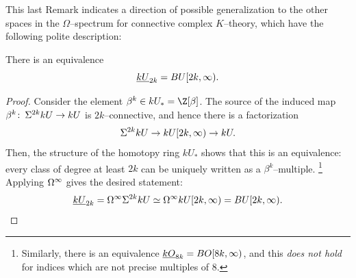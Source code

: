 This last Remark indicates a direction of possible generalization to the other spaces in the \(\Omega\)--spectrum for connective complex \(K\)--theory, which have the following polite description:
\begin{lemma}
There is an equivalence \[\OS{kU}{2k} = BU[2k, \infty).\]
\end{lemma}
\begin{proof}
Consider the element \(\beta^k \in kU_* = \Z[\beta]\).
The source of the induced map \(\beta^k\colon\thinspace \Sigma^{2k} kU \to kU\) is \(2k\)--connective, and hence there is a factorization \[\Sigma^{2k} kU \to kU[2k, \infty) \to kU.\]
Then, the structure of the homotopy ring \(kU_*\) shows that this is an equivalence: every class of degree at least \(2k\) can be uniquely written as a \(\beta^k\)--multiple.%
\footnote{%
Similarly, there is an equivalence \(\OS{kO}{8k} = BO[8k, \infty)\), and this \emph{does not hold} for indices which are not precise multiples of \(8\).
}
Applying \(\Omega^\infty\) gives the desired statement: \[\OS{kU}{2k} = \Loops^\infty \Susp^{2k} kU \simeq \Loops^\infty kU[2k, \infty) = BU[2k, \infty). \qedhere\]
\end{proof}


